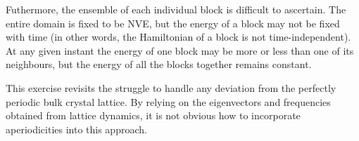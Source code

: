 Futhermore, the ensemble of each individual block is difficult to ascertain. The entire domain is fixed to be NVE, but the energy of a block may not be fixed with time (in other words, the Hamiltonian of a block is not time-independent). At any given instant the energy of one block may be more or less than one of its neighbours, but the energy of all the blocks together remains constant.

This exercise revisits the struggle to handle any deviation from the perfectly periodic bulk crystal lattice. By relying on the eigenvectors and frequencies obtained from lattice dynamics, it is not obvious how to incorporate aperiodicities into this approach.


